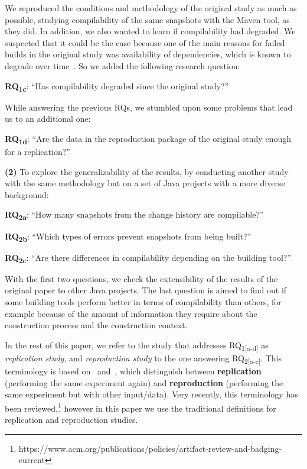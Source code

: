 We reproduced the conditions and methodology of the original study as much as possible, studying compilability of the same snapshots with the Maven tool, as they did. 
In addition, we also wanted to learn if compilability had degraded. We suspected that it could be the case because one of the main reasons for failed builds in the original study was availability of dependencies, which is known to degrade over time~\cite{bavota2015apache}. So we added the following research question:

\textbf{RQ\textsubscript{1c}}: ``Has compilability degraded since the original study?''

While answering the previous RQs, we stumbled upon some problems that lead us to an additional one:

\textbf{RQ\textsubscript{1d}}: ``Are the data in the reproduction package of the original study enough for a replication?''

\textbf{(2)} To explore the generalizability of the results, by conducting another study with the same methodology but on a  set of Java projects with a more diverse background:

\textbf{RQ\textsubscript{2a}}: ``How many snapshots from the change history are compilable?''

\textbf{RQ\textsubscript{2b}}: ``Which types of errors prevent snapshots from being built?''

\textbf{RQ\textsubscript{2c}}: ``Are there differences in compilability depending on the building tool?''

With the first two questions, we check the extensibility of the results of the original paper to other Java projects. 
The last question is aimed to find out if some building tools perform better in terms of compilability than others, for example because of the amount of information they require about the construction process and the construction context.

In the rest of this paper, we refer to the study that addresses RQ\textsubscript{1[a-d]} as \emph{replication study}, and \emph{reproduction study} to the one answering RQ\textsubscript{2[a-c]}. 
This terminology is based on~\cite{juristo2010replication} and~\cite{cartwright1991replicability}, which distinguish between \textbf{replication} (performing the same experiment again) and \textbf{reproduction} (performing the same experiment but with other input/data). Very recently, this terminology has been reviewed,\footnote{https://www.acm.org/publications/policies/artifact-review-and-badging-current} however in this paper we use the traditional definitions for replication and reproduction studies.

